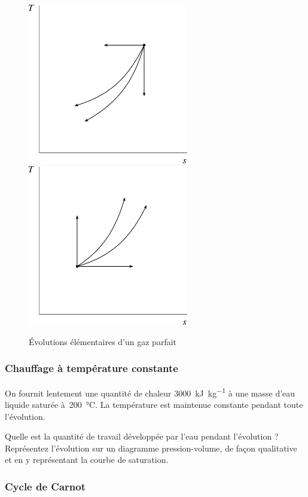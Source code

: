 	\begin{figure}
		\begin{center}
			\includegraphics[width=7cm]{images/tsel1.png}
			\includegraphics[width=7cm]{images/tsel2.png}
		\end{center}
		\caption{Évolutions élémentaires d’un gaz parfait}
		\label{fig_tsel}
	\end{figure}


\subsubsection{Chauffage à température constante}

	On fournit lentement une quantité de chaleur \SI{3000}{\kilo\joule\per\kilogram} à une masse d’eau liquide saturée à~\SI{200}{\degreeCelsius}. La température est maintenue constante pendant toute l’évolution.
	
	Quelle est la quantité de travail développée par l’eau pendant l’évolution ? Représentez l’évolution sur un diagramme pression-volume, de façon qualitative et en y représentant la courbe de saturation.
	
\subsubsection{Cycle de Carnot}

